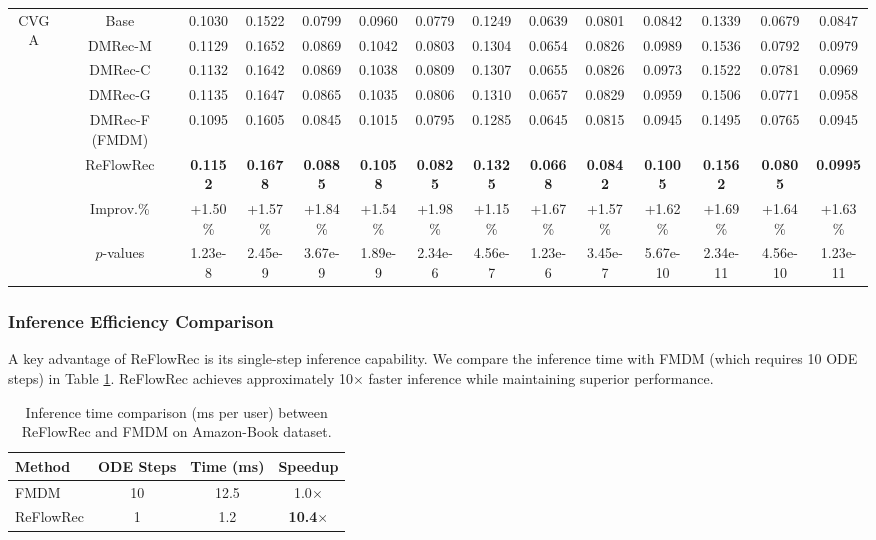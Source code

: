 \documentclass[sigconf]{acmart}
\begin{document}
\begin{table}
\begin{tabular}{c|c|cccc|cccc|cccc}
      \hline
        \multirow{5}{*}{CVGA} &Base \cite{zhang2023revisiting} & 0.1030 & 0.1522 & 0.0799 & 0.0960 & 0.0779 & 0.1249 & 0.0639 & 0.0801 &0.0842 &0.1339 & 0.0679 & 0.0847\\
    \cline{2-14}
    ~ &\textsf{DMRec-M} & 0.1129 & 0.1652 & 0.0869 & 0.1042 & 0.0803 & 0.1304 & 0.0654 & 0.0826 & 0.0989 & 0.1536 & 0.0792 & 0.0979\\
    ~ & \textsf{DMRec-C} & 0.1132 & 0.1642 & 0.0869 & 0.1038 & 0.0809 & 0.1307 & 0.0655 & 0.0826 & 0.0973 & 0.1522 & 0.0781 & 0.0969\\
    ~ & \textsf{DMRec-G} & 0.1135 & 0.1647 & 0.0865 & 0.1035 & 0.0806 & 0.1310 & 0.0657 & 0.0829 & 0.0959 & 0.1506 & 0.0771 & 0.0958\\
    ~ & \textsf{DMRec-F} (FMDM) & 0.1095 & 0.1605 & 0.0845 & 0.1015 & 0.0795 & 0.1285 & 0.0645 & 0.0815 & 0.0945 & 0.1495 & 0.0765 & 0.0945\\
    \cline{2-14}
    ~ & \textsf{ReFlowRec} & \textbf{0.1152} & \textbf{0.1678} & \textbf{0.0885} & \textbf{0.1058} & \textbf{0.0825} & \textbf{0.1325} & \textbf{0.0668} & \textbf{0.0842} & \textbf{0.1005} & \textbf{0.1562} & \textbf{0.0805} & \textbf{0.0995}\\
    \cline{2-14}
     ~ & Improv.\% & +1.50\% & +1.57\% & +1.84\% & +1.54\% & +1.98\% & +1.15\% & +1.67\% & +1.57\% & +1.62\% & +1.69\% & +1.64\% & +1.63\%\\
     ~ & $p$-values & 1.23e-8 & 2.45e-9 & 3.67e-9 & 1.89e-9 & 2.34e-6 & 4.56e-7 & 1.23e-6 & 3.45e-7 & 5.67e-10 & 2.34e-11 & 4.56e-10 & 1.23e-11\\
\hline
  \end{tabular}
\end{table}

\subsubsection{\textbf{Inference Efficiency Comparison}}
A key advantage of \textsf{ReFlowRec} is its single-step inference capability. We compare the inference time with FMDM (which requires 10 ODE steps) in Table \ref{inference_time}. \textsf{ReFlowRec} achieves approximately 10$\times$ faster inference while maintaining superior performance.

\begin{table}[t]
\small
\setlength{\abovecaptionskip}{0.1cm}
\setlength{\belowcaptionskip}{0.1cm} 
  \caption{Inference time comparison (ms per user) between \textsf{ReFlowRec} and FMDM on Amazon-Book dataset.}
  \label{inference_time}
  \begin{tabular}{l|c|c|c}
    \hline
    \textbf{Method} & \textbf{ODE Steps} & \textbf{Time (ms)} & \textbf{Speedup}\\
    \hline
    FMDM & 10 & 12.5 & 1.0$\times$\\
    \textsf{ReFlowRec} & 1 & 1.2 & \textbf{10.4$\times$}\\
    \hline
  \end{tabular}
\end{table}
\end{document}
